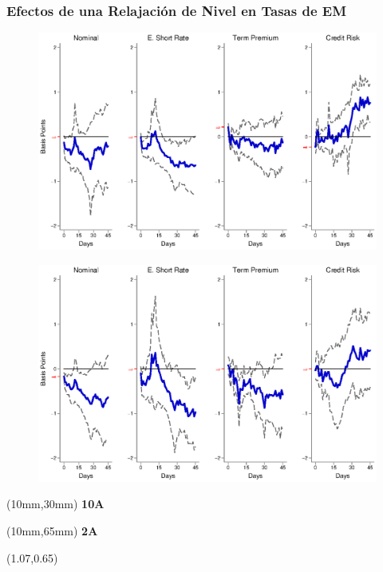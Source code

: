 \documentclass[12pt, aspectratio=169, xcolor=dvipsnames]{beamer}
\begin{document}
\begin{frame}[label=TargetEM]
\frametitle{Efectos de una Relajación de Nivel en Tasas de EM}
\begin{figure}[!htbp]
\begin{center} %
\includegraphics[trim={0cm 0cm 0cm 0cm},clip,height=0.45\textheight,width=0.85\linewidth]{../Figures/LPs/LagDep-FX/Target/EM/TargetEMnomyptpphi120m.eps}
\par\end{center}
\end{figure}
\vspace{-0.5cm}
\begin{figure}[!htbp]
\begin{center} %
\includegraphics[trim={0cm 0cm 0cm 0.76cm},clip,height=0.45\textheight,width=0.85\linewidth]{../Figures/LPs/LagDep-FX/Target/EM/TargetEMnomyptpphi24m.eps}
\par\end{center}
\end{figure}
\begin{textblock*}{8mm}(10mm,30mm)
\small \textbf{10A}
\end{textblock*}
\begin{textblock*}{8mm}(10mm,65mm)
\small \textbf{2A}
\end{textblock*}
\begin{textblock*}{5cm}(1.07\textwidth,0.65\textheight)
\hyperlink{TargetUS}{}
\end{textblock*}
\end{frame}
\end{document}
